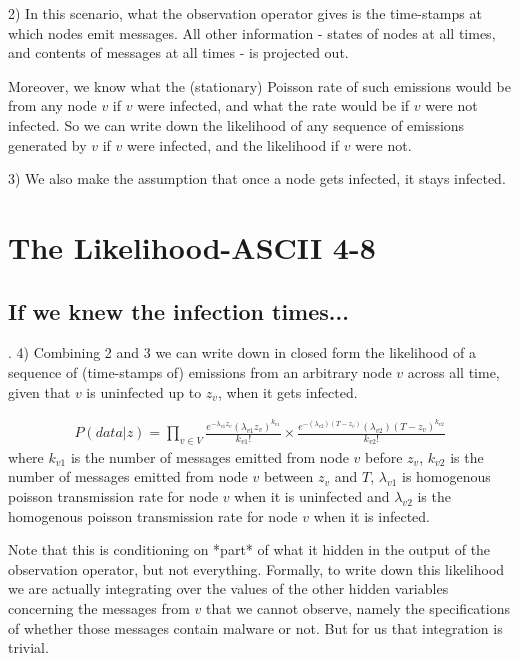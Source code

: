 \documentclass{article}
\begin{document}
	2) In this scenario, what the observation operator gives is the
	time-stamps at which nodes emit messages. All other information -
	states of nodes at all times, and contents of messages at all times -
	is projected out.

	Moreover, we know what the (stationary) Poisson rate of such emissions
	would be from any node $v$ if $v$ were infected, and what the rate would
	be if $v$ were not infected. So we can write down the likelihood of any
	sequence of emissions generated by $v$ if $v$ were infected, and the
	likelihood if $v$ were not.

	3) We also make the assumption that once a node gets infected, it
	stays infected.

\section{The Likelihood-ASCII 4-8}
\subsection{If we knew the infection times...}	
    .
	4) Combining 2 and 3  we can write down in closed form the likelihood
        of a sequence of (time-stamps of) emissions from an arbitrary node $v$ 
        across all time, given that  $v$ is uninfected up to $z_{v}$, when it 
        gets infected. 
        
        \begin{align}
        P(data | z) = \prod_{v\in V}\frac{e^{-\lambda_{v1}z_v}(\lambda_{v1}z_v)^{k_{v1}}}{k_{v1}!}\times 
        \frac{e^{-(\lambda_{v2})(T-z_v)}(\lambda_{v2})(T-z_v)^{k_{v2}}}{k_{v2}!}
        \end{align}
        where $k_{v1}$ is the number of messages emitted from node $v$ before 
        $z_v$, $k_{v2}$ is the number of messages emitted from node $v$ between 
        $z_v$ and $T$, $\lambda_{v1}$ is  homogenous poisson transmission rate for
        node $v$ when it is uninfected and $\lambda_{v2}$ is the  homogenous 
        poisson transmission rate for node $v$ when it is infected.  
 
	Note that this is conditioning on *part* of what it hidden in the
	output of the observation operator, but not everything.  Formally, to
	write down this likelihood we are actually integrating over the values
	of the other hidden variables concerning the messages from $v$ that we
	cannot observe, namely the specifications of whether those messages
	contain malware or not. But for us that integration is trivial. 
\end{document}
